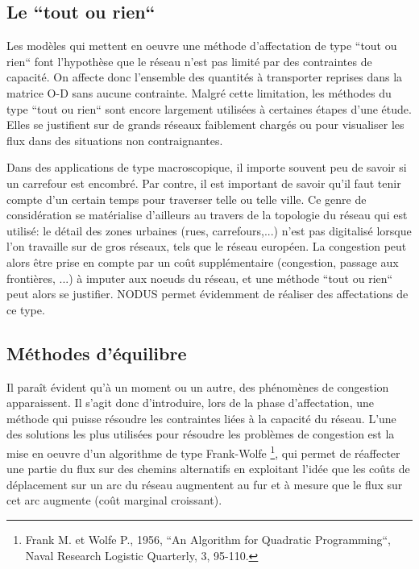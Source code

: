 \subsection{Le ``tout ou rien``}

Les modèles qui mettent en oeuvre une méthode d'affectation de type ``tout ou
rien`` font l'hypothèse que le réseau n'est pas limité par des contraintes de
capacité. On affecte donc l'ensemble des quantités à transporter reprises dans
la matrice O-D sans aucune contrainte. Malgré cette limitation, les méthodes du
type ``tout ou rien`` sont encore largement utilisées à certaines étapes d'une
étude. Elles se justifient sur de grands réseaux faiblement chargés ou pour
visualiser les flux dans des situations non contraignantes.


Dans des applications de type macroscopique, il importe souvent peu de savoir si
un carrefour est encombré. Par contre, il est important de savoir qu'il faut
tenir compte d'un certain temps pour traverser telle ou telle ville. Ce genre de
considération se matérialise d'ailleurs au travers de la topologie du réseau qui
est utilisé: le détail des zones urbaines (rues, carrefours,...) n'est pas
digitalisé lorsque l'on travaille sur de gros réseaux, tels que le réseau
européen. La conges\-tion peut alors être prise en compte par un coût
supplémentaire (congestion, passage aux frontières, ...) à imputer aux noeuds du
réseau, et une méthode ``tout ou rien`` peut alors se justifier. NODUS permet
évidemment de réaliser des affectations de ce type.



\subsection{M\'ethodes d'\'equilibre}


Il paraît évident qu'à un moment ou un autre, des phénomènes de
congestion apparaissent. Il s'agit donc d'introduire, lors de la
phase d'affectation, une méthode qui puisse résoudre les
contraintes liées à la capacité du réseau. L'une des solutions les
plus utilisées pour résoudre les problèmes de congestion est la
mise en oeuvre d'un algorithme de type Frank-Wolfe
\footnote{Frank M. et Wolfe P., 1956, ``An Algorithm for Quadratic
Programming``, Naval Research Logistic Quarterly, 3, 95-110.}, qui
permet de réaffecter une partie du flux sur des chemins alternatifs
en exploitant l'idée que les coûts de déplacement sur un arc du
réseau augmentent au fur et à mesure que le flux sur cet arc
augmente (coût marginal croissant).

